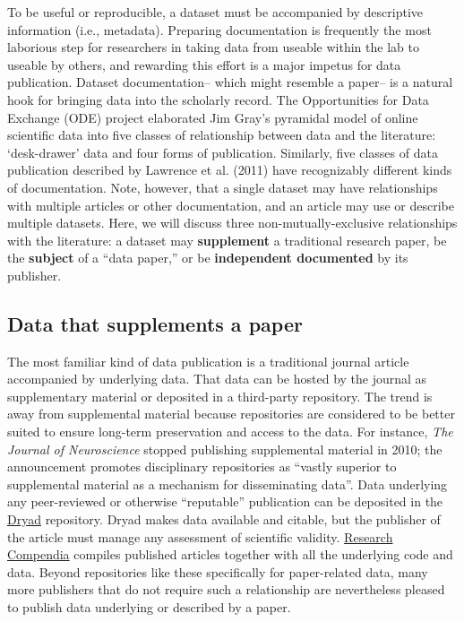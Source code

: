 \documentclass[10pt,a4paper,twocolumn]{article}
\begin{document}
{{To be useful or reproducible, a dataset must be accompanied by descriptive information (i.e., metadata)\cite{gray_online_2002}.
Preparing documentation is frequently the most laborious step for researchers in taking data from useable within the lab to useable by others, and rewarding this effort is a major impetus for data publication.
Dataset documentation-- which might resemble a paper-- is a natural hook for bringing data into the scholarly record.
The Opportunities for Data Exchange (ODE) project elaborated Jim Gray's pyramidal model of online scientific data\cite{hey_jim_2009} into five classes of relationship between data and the literature: `desk-drawer' data and four forms of publication\cite{reilly_report_2011}.
Similarly, five classes of data publication described by Lawrence et al. (2011) have recognizably different kinds of documentation\cite{lawrence_citation_2011}.
Note, however, that a single dataset may have relationships with multiple articles or other documentation, and an article may use or describe multiple datasets.
Here, we will discuss three non-mutually-exclusive relationships with the literature: a dataset may \textbf{supplement} a traditional research paper, be the \textbf{subject} of a ``data paper,'' or be \textbf{independent documented} by its publisher.

\subsection*{Data that supplements a paper}\label{paper-supplement-data}

The most familiar kind of data publication is a traditional journal article accompanied by underlying data.
That data can be hosted by the journal as supplementary material or deposited in a third-party repository.
The trend is away from supplemental material because repositories are considered to be better suited to ensure long-term preservation and access to the data.
For instance, \emph{The Journal of Neuroscience} stopped publishing supplemental material in 2010; the announcement promotes disciplinary repositories as ``vastly superior to supplemental material as a mechanism for disseminating data''\cite{maunsell_announcement_2010}.
Data underlying any peer-reviewed or otherwise ``reputable'' publication can be deposited in the \href{http://datadryad.org/}{Dryad} repository.
Dryad makes data available and citable, but the publisher of the article must manage any assessment of scientific validity.
\href{http://researchcompendia.org/}{Research Compendia} compiles published articles together with all the underlying code and data.
Beyond repositories like these specifically for paper-related data, many more publishers that do not require such a relationship are nevertheless pleased to publish data underlying or described by a paper.

}}
\end{document}
